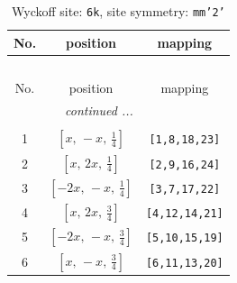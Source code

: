 \documentclass[fleqn,8pt]{jsarticle}
\begin{document}
\renewcommand{\arraystretch}{1.2}
\begin{longtable}{ccc}
\caption{Wyckoff site: {\tt 6k}, site symmetry: {\tt mm'2'}}
 \\
 \hline \hline
No. & position & mapping \\ \hline \endfirsthead

\multicolumn{2}{l}{\tablename\ \thetable{}} \\
 \hline \hline
No. & position & mapping \\ \hline \endhead

 \hline \hline
\multicolumn{2}{r}{\footnotesize\it continued ...} \\ \endfoot

 \hline \hline
\multicolumn{2}{r}{} \\ \endlastfoot

1 & $\left[ x,\, - x,\, \frac{1}{4} \right]$ & {\tt [1,8,18,23]} \\ \hline
2 & $\left[ x,\, 2 x,\, \frac{1}{4} \right]$ & {\tt [2,9,16,24]} \\ \hline
3 & $\left[ - 2 x,\, - x,\, \frac{1}{4} \right]$ & {\tt [3,7,17,22]} \\ \hline
4 & $\left[ x,\, 2 x,\, \frac{3}{4} \right]$ & {\tt [4,12,14,21]} \\ \hline
5 & $\left[ - 2 x,\, - x,\, \frac{3}{4} \right]$ & {\tt [5,10,15,19]} \\ \hline
6 & $\left[ x,\, - x,\, \frac{3}{4} \right]$ & {\tt [6,11,13,20]} \\
\end{longtable}
\renewcommand{\arraystretch}{1.2}
\end{document}
